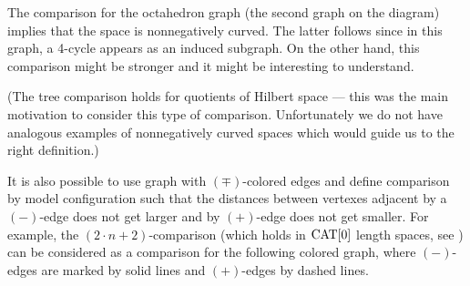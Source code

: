 \begin{center}
\hskip30mm
\end{center}

The comparison for the octahedron graph (the second graph on the diagram) implies that the space is nonnegatively curved.
The latter follows since in this graph, a 4-cycle appears as an induced subgraph.
On the other hand, this comparison might be stronger and it might be interesting to understand.

(The tree comparison holds for quotients of Hilbert space --- this was the main motivation to consider this type of comparison. 
Unfortunately we do not have analogous examples of nonnegatively curved spaces which would guide us to the right definition.)

It is also possible to use graph with $(\mp)$-colored edges and define comparison by model configuration such that the distances between vertexes adjacent by a $(-)$-edge does not get larger and by $(+)$-edge does not get smaller.
For example, the $(2{\cdot}n+2)$-comparison (which holds in $\mathop{\rm CAT}\nolimits[0]$ length spaces, see \cite{AKP}) can be considered as a comparison for the following colored graph, where $(-)$-edges are marked by solid lines and $(+)$-edges by dashed lines.

